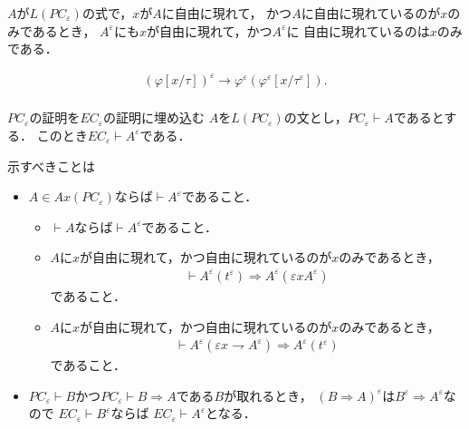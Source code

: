 	$A$が$L(PC_{\varepsilon})$の式で，$x$が$A$に自由に現れて，
	かつ$A$に自由に現れているのが$x$のみであるとき，
	$A^{\varepsilon}$にも$x$が自由に現れて，かつ$A^{\varepsilon}$に
	自由に現れているのは$x$のみである．
	
	\begin{align}
		(\varphi[x/\tau])^{\varepsilon} \rightarrow \varphi^{\varepsilon}
		(\varphi^{\varepsilon}[x/\tau^{\varepsilon}]). \\
	\end{align}
	
	\begin{itembox}[c]{$PC_{\varepsilon}$の証明を$EC_{\varepsilon}$の証明に埋め込む}
		$A$を$L(PC_{\varepsilon})$の文とし，$PC_{\varepsilon} \vdash A$であるとする．
		このとき$EC_{\varepsilon} \vdash A^{\varepsilon}$である．
	\end{itembox}
	
	示すべきことは
	\begin{itemize}
		\item $A \in Ax(PC_{\varepsilon})$ならば$\vdash A^{\varepsilon}$であること．
			\begin{itemize}
				\item $\vdash A$ならば$\vdash A^{\varepsilon}$であること．
				\item $A$に$x$が自由に現れて，かつ自由に現れているのが$x$のみであるとき，
					\begin{align}
						\vdash A^{\varepsilon}(t^{\varepsilon}) \Longrightarrow A^{\varepsilon}(\varepsilon x A^{\varepsilon})
					\end{align}
					であること．
				\item $A$に$x$が自由に現れて，かつ自由に現れているのが$x$のみであるとき，
					\begin{align}
						\vdash A^{\varepsilon}(\varepsilon x \rightharpoondown A^{\varepsilon}) \Longrightarrow A^{\varepsilon}(t^{\varepsilon})
					\end{align}
					であること．
			\end{itemize}
		
		\item $PC_{\varepsilon} \vdash B$かつ$PC_{\varepsilon} \vdash B \Longrightarrow A$である$B$が取れるとき，
			$(B \Longrightarrow A)^{\varepsilon}$は$B^{\varepsilon} \Longrightarrow A^{\varepsilon}$なので
			$EC_{\varepsilon} \vdash B^{\varepsilon}$ならば
			$EC_{\varepsilon} \vdash A^{\varepsilon}$となる．
	\end{itemize}
	
